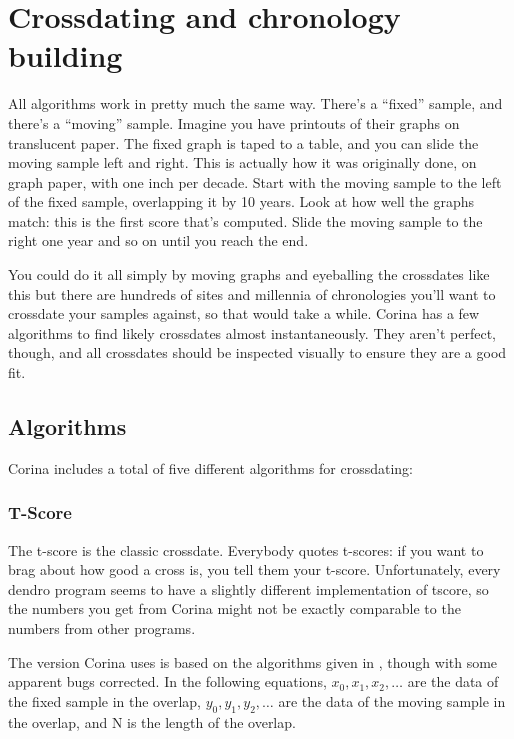 \chapter{Crossdating and chronology building}
\label{txt:crossdating}

All algorithms work in pretty much the same way. There's a ``fixed'' sample, and there's a ``moving'' sample. Imagine you have printouts of their graphs on translucent paper. The fixed graph is taped to a table, and you can slide the moving sample left and right. This is actually how it was originally done, on graph paper, with one inch per decade. Start with the moving sample to the left of the fixed sample, overlapping it by 10 years. Look at how well the graphs match: this is the first score that's computed. Slide the moving sample to the right one year and so on until you reach the end.

You could do it all simply by moving graphs and eyeballing the crossdates like this but there are hundreds of sites and millennia of chronologies you'll want to crossdate your samples against, so that would take a while. Corina has a few algorithms to find likely crossdates almost instantaneously. They aren't perfect, though, and all crossdates should be inspected visually to ensure they are a good fit. 

\section{Algorithms}
Corina includes a total of five different algorithms for crossdating:


\subsection{T-Score}
	
The t-score is the classic crossdate. Everybody quotes t-scores: if you want to brag about how good a cross is, you tell them your t-score. Unfortunately, every dendro program seems to have a slightly different implementation of tscore, so the numbers you get from Corina might not be exactly comparable to the numbers from other programs. 

The version Corina uses is based on the algorithms given in \citet{Baillie73}, though with some apparent bugs corrected. In the following equations, $x_{0}, x_{1}, x_{2}, \dots$ are the data of the fixed sample in the overlap, $y_{0}, y_{1}, y_{2}, \dots$ are the data of the moving sample in the overlap, and N is the length of the overlap.

